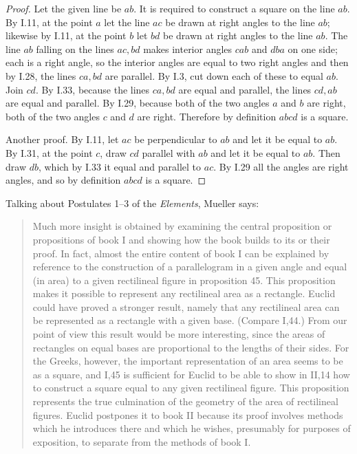 \documentclass{article}
\begin{document}
\begin{proof}
Let the given line be $ab$.
It is required to construct a square on the line $ab$.
By I.11, at the point $a$ let the line $ac$ be drawn at right angles to the line $ab$; likewise
by I.11, at the point $b$ let $bd$ be drawn at right angles to the line $ab$.
The line $ab$ falling on the lines $ac, bd$ makes interior angles $cab$ and $dba$ on one side; each is a right angle, so the interior angles
are equal to two right angles and then by I.28, the lines $ca,bd$ are parallel.
By I.3, cut down each of these to equal $ab$. 
Join $cd$. By I.33, because the lines $ca,bd$ are equal and parallel, the lines $cd,ab$ are equal and parallel.
By I.29, because both of the two angles $a$ and $b$ are right, both of the two angles $c$ and $d$ are right. Therefore by definition $abcd$
is a square.  

Another proof. By I.11, let $ac$ be perpendicular to $ab$ and let it be equal to $ab$. By I.31, at the point $c$, draw $cd$ parallel
with $ab$ and let it be equal to $ab$. Then draw $db$, which by I.33 it equal and parallel to $ac$.
By I.29 all the angles are right angles, and so by definition $abcd$ is a square.
\end{proof}







Talking about Postulates 1--3 of the {\em Elements}, Mueller \cite[p.~16]{mueller} says:

\begin{quote}
Much more insight is obtained by examining the central proposition or propositions of book I and showing how the
book builds to its or their proof. In fact, almost the entire content of book I can be explained by reference to the construction of a 
parallelogram in a given angle and equal (in area) to a given rectilineal figure in proposition 45. This proposition makes it possible to represent
any rectilineal area as a rectangle. Euclid could have proved a stronger result, namely that any rectilineal area can be represented as a rectangle with a given base.
(Compare I,44.) From our point of view this result would be more interesting, since the areas of rectangles on equal bases are proportional
to the lengths of their sides. For the Greeks, however, the important representation of an area seems to be as a square, and I,45 is sufficient
for Euclid to be able to show in II,14 how to construct a square equal to any given rectilineal figure. This proposition represents
the true culmination of the geometry of the area of rectilineal figures. Euclid postpones it to book II because its proof involves methods which he introduces there and which he wishes, presumably for purposes of exposition, to separate from the methods of book I.
\end{quote}
\end{document}
